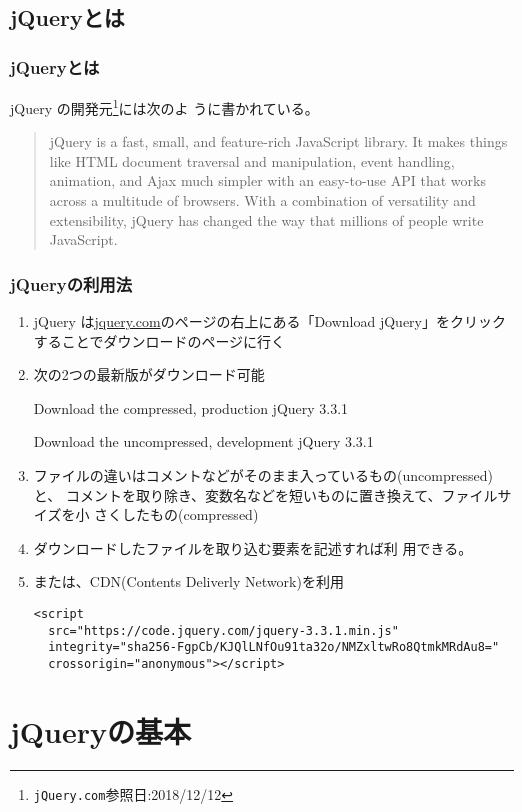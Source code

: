 \subsection{jQueryとは}
\begin{frame}[containsverbatim]
\frametitle{jQueryとは}
jQuery の開発元\footnote{\texttt{jQuery.com}参照日:2018/12/12}には次のよ
 うに書かれている。
\begin{quotation}
jQuery is a fast, small, and feature-rich JavaScript library. It makes
 things like HTML document traversal and manipulation, event handling,
 animation, and Ajax much simpler with an easy-to-use API that works
 across a multitude of browsers. With a combination of versatility and
 extensibility, jQuery has changed the way that millions of people write
 JavaScript.
\end{quotation}
\end{frame}
\begin{frame}[containsverbatim]
\frametitle{jQueryの利用法}
\begin{enumerate}
 \item jQuery は\href{jquery.com}{jquery.com}のページの右上にある「Download
jQuery」をクリックすることでダウンロードのページに行く
 \item 次の2つの最新版がダウンロード可能

     Download the compressed, production jQuery 3.3.1

    Download the uncompressed, development jQuery 3.3.1
 \item ファイルの違いはコメントなどがそのまま入っているもの(uncompressed)と、
コメントを取り除き、変数名などを短いものに置き換えて、ファイルサイズを小
さくしたもの(compressed)
 \item ダウンロードしたファイルを取り込む要素を記述すれば利
       用できる。
 \item または、CDN(Contents Deliverly Network)を利用
\begin{Verbatim}[fontsize=\small]
<script
  src="https://code.jquery.com/jquery-3.3.1.min.js"
  integrity="sha256-FgpCb/KJQlLNfOu91ta32o/NMZxltwRo8QtmkMRdAu8="
  crossorigin="anonymous"></script>
\end{Verbatim}
\end{enumerate}

\end{frame}
\newcommand{\FuncRef}[1]{%
\refstepcounter{Func}\label{#1}({\bfseries 機能\arabic{Func}})}
\section{jQueryの基本}
